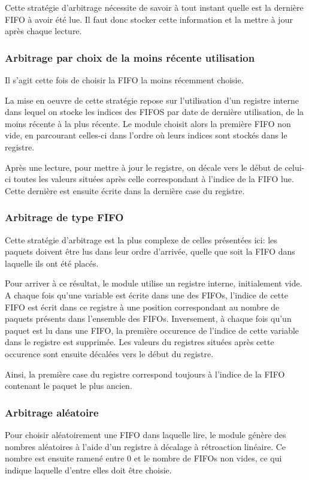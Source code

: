 \documentclass[11pt]{article}
\begin{document}
Cette stratégie d'arbitrage nécessite de savoir à tout instant quelle est la dernière FIFO à avoir
été lue.
Il faut donc stocker cette information et la mettre à jour après chaque lecture.

\subsubsection{Arbitrage par choix de la moins récente utilisation}
Il s'agit cette fois de choisir la FIFO la moins récemment choisie.

La mise en oeuvre de cette stratégie repose sur l'utilisation d'un registre interne
dans lequel on stocke les indices des FIFOS par date de dernière utilisation, de la moins récente à la plus récente.
Le module  choisit alors la première FIFO non vide, en parcourant celles-ci dans l'ordre où leurs indices sont stockés
dans le registre.

Après une lecture, pour mettre à jour le registre, on décale vers le début de celui-ci toutes les valeurs
situées après celle correspondant à l'indice de la FIFO lue.
Cette dernière est ensuite écrite dans la dernière case du registre.

\subsubsection{Arbitrage de type FIFO}
Cette stratégie d'arbitrage est la plus complexe de celles présentées ici:
les paquets doivent être lus dans leur ordre d'arrivée, quelle que soit
la FIFO dans laquelle ils ont été placés.

Pour arriver à ce résultat, le module utilise un registre interne, initialement vide.
A chaque fois qu'une variable est écrite dans une des FIFOs, l'indice de cette FIFO est écrit dans ce registre
à une position correspondant au nombre de paquets présents dans l'ensemble des FIFOs.
Inversement, à chaque fois qu'un paquet est lu dans une FIFO, la première occurence de l'indice de cette
variable dans le registre est supprimée. Les valeurs du registres situées après cette occurence sont ensuite décalées vers le début du registre.

Ainsi, la première case du registre correspond toujours à l'indice de la FIFO contenant le paquet le plus ancien.

\subsubsection{Arbitrage aléatoire}
Pour choisir aléatoirement une FIFO dans laquelle lire, le module génère des nombres aléatoires
à l'aide d'un registre à décalage à rétroaction linéaire.
Ce nombre est ensuite ramené entre 0 et le nombre de FIFOs non vides, ce qui indique laquelle d'entre elles doit être choisie.
\end{document}
